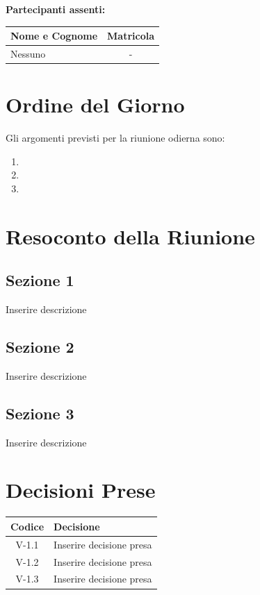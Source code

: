 \documentclass[a4paper, 11pt]{article}
\begin{document}
\vspace{0.5cm}
\textbf{Partecipanti assenti:} \\
\vspace{0.2cm}
\renewcommand{\arraystretch}{1.2}
\begin{tabularx}{0.8\textwidth}{|X|c|}
\hline
\textbf{Nome e Cognome} & \textbf{Matricola} \\ \hline
Nessuno & - \\ \hline
\end{tabularx}

\section{Ordine del Giorno}
Gli argomenti previsti per la riunione odierna sono:
\begin{enumerate}
    \item 
    \item 
    \item 
\end{enumerate}

\section{Resoconto della Riunione}

\subsection{Sezione 1}
Inserire descrizione

\subsection{Sezione 2}
Inserire descrizione

\subsection{Sezione 3}
Inserire descrizione



\section{Decisioni Prese}
\renewcommand{\arraystretch}{1.5}
\begin{tabularx}{\textwidth}{|c|X|}
\hline
\textbf{Codice} & \textbf{Decisione} \\ \hline
V-1.1 & Inserire decisione presa \\ \hline
V-1.2 & Inserire decisione presa \\ \hline
V-1.3 & Inserire decisione presa \\ \hline
\end{tabularx}
\end{document}
